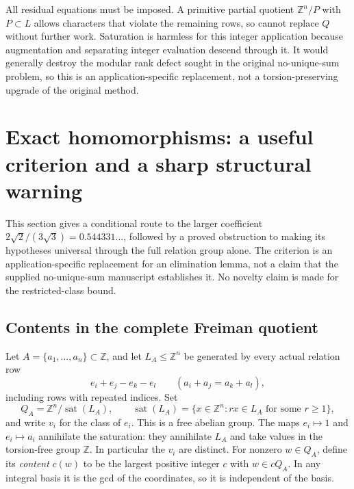 \documentclass[11pt]{article}
\theoremstyle{definition}
\theoremstyle{remark}
\newcommand{\Z}{\mathbb Z}
\newcommand{\F}{\mathbb F}
\newcommand{\ceil}[1]{\left\lceil #1\right\rceil}
\DeclareMathOperator{\sat}{sat}
\begin{document}
All residual equations must be imposed. A primitive partial quotient
$\Z^n/P$ with $P\subset L$ allows characters that violate the remaining
rows, so cannot replace $Q$ without further work. Saturation is harmless
for this integer application because augmentation and separating integer
evaluation descend through it. It would generally destroy the modular
rank defect sought in the original no-unique-sum problem, so this is an
application-specific replacement, not a torsion-preserving upgrade of
the original method.

\section{Exact homomorphisms: a useful criterion and a sharp structural warning}
\label{sec:content-hashing}

This section gives a conditional route to the larger coefficient
$2\sqrt2/(3\sqrt3)=0.544331\ldots$, followed by a proved obstruction to
making its hypotheses universal through the full relation group alone.
The criterion is an application-specific replacement for an elimination
lemma, not a claim that the supplied no-unique-sum manuscript establishes
it. No novelty claim is made for the restricted-class bound.

\subsection{Contents in the complete Freiman quotient}

Let $A=\{a_1,\ldots,a_n\}\subset\Z$, and let $L_A\le\Z^n$ be generated
by every actual relation row
\[
e_i+e_j-e_k-e_l\qquad(a_i+a_j=a_k+a_l),
\]
including rows with repeated indices. Set
\[
Q_A=\Z^n/\sat(L_A),\qquad
\sat(L_A)=\{x\in\Z^n:rx\in L_A\text{ for some }r\ge1\},
\]
and write $v_i$ for the class of $e_i$. This is a free abelian group.
The maps $e_i\mapsto1$ and $e_i\mapsto a_i$ annihilate the saturation:
they annihilate $L_A$ and take values in the torsion-free group $\Z$.
In particular the $v_i$ are distinct.
For nonzero $w\in Q_A$, define its \emph{content} $c(w)$ to be the
largest positive integer $c$ with $w\in cQ_A$. In any integral basis it
is the gcd of the coordinates, so it is independent of the basis.
\end{document}
